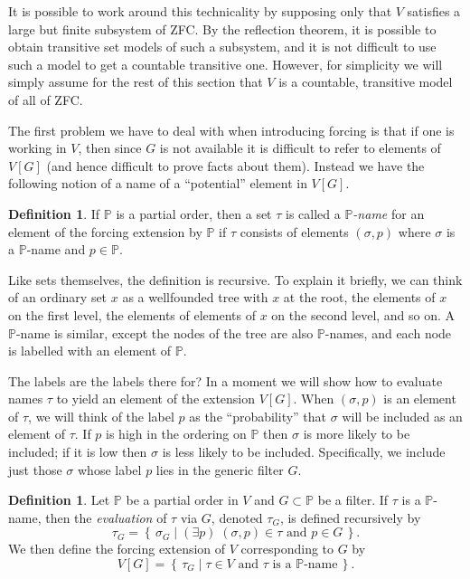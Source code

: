 \documentclass[11pt,oneside]{amsbook}
\newcommand{\set}[1]{\left\{\,#1\,\right\}}
\newcommand{\PP}{\mathbb P}
\theoremstyle{definition}
\theoremstyle{plain}
\theoremstyle{definition}
\newtheorem{defn}[thm]{Definition}
\theoremstyle{remark}
\begin{document}
It is possible to work around this technicality by supposing only that $V$ satisfies a large but finite subsystem of ZFC. By the reflection theorem, it is possible to obtain transitive set models of such a subsystem, and it is not difficult to use such a model to get a countable transitive one. However, for simplicity we will simply assume for the rest of this section that $V$ is a countable, transitive model of all of ZFC.

The first problem we have to deal with when introducing forcing is that if one is working in $V$, then since $G$ is not available it is difficult to refer to elements of $V[G]$ (and hence difficult to prove facts about them). Instead we have the following notion of a name of a ``potential'' element in $V[G]$.

\begin{defn}
  If $\PP$ is a partial order, then a set $\tau$ is called a \emph{$\PP$-name} for an element of the forcing extension by $\mathbb P$ if $\tau$ consists of elements $(\sigma,p)$ where $\sigma$ is a \emph{$\PP$}-name and $p\in\PP$.
\end{defn}

Like sets themselves, the definition is recursive. To explain it briefly, we can think of an ordinary set $x$ as a wellfounded tree with $x$ at the root, the elements of $x$ on the first level, the elements of elements of $x$ on the second level, and so on. A $\PP$-name is similar, except the nodes of the tree are also $\PP$-names, and each node is labelled with an element of $\PP$. 

The labels are the labels there for? In a moment we will show how to evaluate names $\tau$ to yield an element of the extension $V[G]$. When $(\sigma,p)$ is an element of $\tau$, we will think of the label $p$ as the ``probability'' that $\sigma$ will be included as an element of $\tau$. If $p$ is high in the ordering on $\PP$ then $\sigma$ is more likely to be included; if it is low then $\sigma$ is less likely to be included. Specifically, we include just those $\sigma$ whose label $p$ lies in the generic filter $G$.

\begin{defn}
  Let $\PP$ be a partial order in $V$ and $G\subset\PP$ be a filter. If $\tau$ is a $\PP$-name, then the \emph{evaluation} of $\tau$ via $G$, denoted $\tau_G$, is defined recursively by
  \[\tau_G=\set{\sigma_G\mid (\exists p)\;(\sigma,p)\in\tau\text{ and }p\in G}\text{.}
  \]
  We then define the forcing extension of $V$ corresponding to $G$ by
  \[V[G]=\set{\tau_G\mid\text{$\tau\in V$ and $\tau$ is a $\PP$-name}}\text{.}
  \]
\end{defn}
\end{document}
